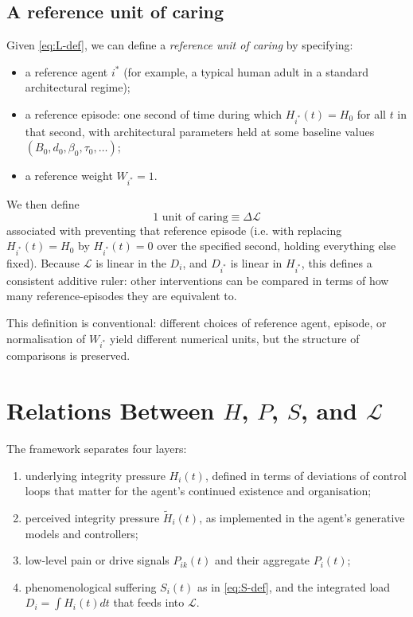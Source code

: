 \documentclass[11pt]{article}
\begin{document}
\subsection{A reference unit of caring}

Given \eqref{eq:L-def}, we can define a \emph{reference unit of caring} by specifying:
\begin{itemize}
  \item a reference agent $i^\ast$ (for example, a typical human adult in a standard architectural regime);
  \item a reference episode: one second of time during which $H_{i^\ast}(t) = H_0$ for all $t$ in that second, with architectural parameters held at some baseline values $(B_0,d_0,\beta_0,\tau_0,\dots)$;
  \item a reference weight $W_{i^\ast} = 1$.
\end{itemize}

We then define
\begin{equation}
  1 \text{ unit of caring} \equiv \Delta \mathcal L
\end{equation}
associated with preventing that reference episode (i.e. with replacing $H_{i^\ast}(t) = H_0$ by $H_{i^\ast}(t) = 0$ over the specified second, holding everything else fixed). Because $\mathcal L$ is linear in the $D_i$, and $D_{i^\ast}$ is linear in $H_{i^\ast}$, this defines a consistent additive ruler: other interventions can be compared in terms of how many reference-episodes they are equivalent to.

This definition is conventional: different choices of reference agent, episode, or normalisation of $W_{i^\ast}$ yield different numerical units, but the structure of comparisons is preserved.

\section{Relations Between $H$, $P$, $S$, and $\mathcal L$}

The framework separates four layers:
\begin{enumerate}
  \item underlying integrity pressure $H_i(t)$, defined in terms of deviations of control loops that matter for the agent's continued existence and organisation;
  \item perceived integrity pressure $\tilde H_i(t)$, as implemented in the agent's generative models and controllers;
  \item low-level pain or drive signals $P_{ik}(t)$ and their aggregate $P_i(t)$;
  \item phenomenological suffering $S_i(t)$ as in \eqref{eq:S-def}, and the integrated load $D_i = \int H_i(t)dt$ that feeds into $\mathcal L$.
\end{enumerate}
\end{document}
